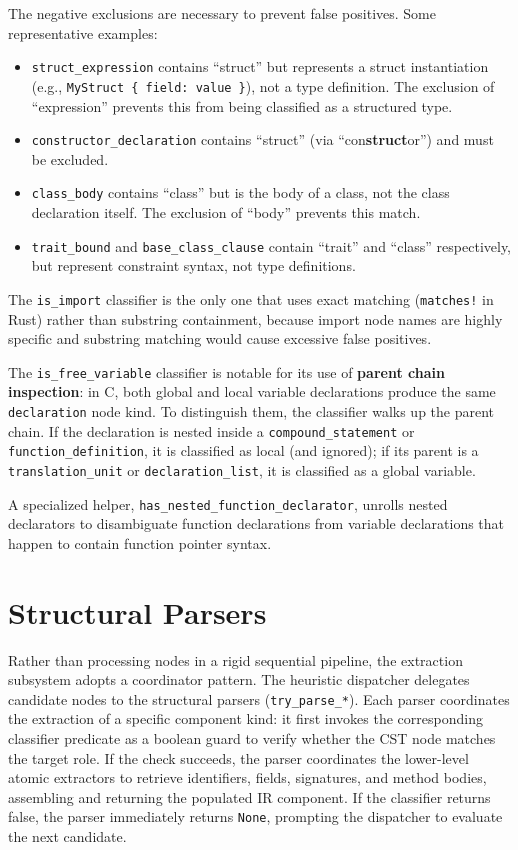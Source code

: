 The negative exclusions are necessary to prevent false positives.
Some representative examples:
\begin{itemize}
  \item \texttt{struct\_expression} contains ``struct'' but
    represents a struct instantiation (e.g., \texttt{MyStruct \{
    field: value \}}), not a type definition. The exclusion of
    ``expression'' prevents this from being classified as a structured type.
  \item \texttt{constructor\_declaration} contains ``struct'' (via
    ``con\textbf{struct}or'') and \linebreak must be excluded.
  \item \texttt{class\_body} contains ``class'' but is the body of a
    class, not the class declaration itself. The exclusion of
    ``body'' prevents this match.
  \item \texttt{trait\_bound} and \texttt{base\_class\_clause}
    contain ``trait'' and ``class'' respectively, but represent
    constraint syntax, not type definitions.
\end{itemize}

The \texttt{is\_import} classifier is the only one that uses exact
matching (\texttt{matches!} in Rust) rather than substring
containment, because import node names are highly specific and
substring matching would cause excessive false positives.

The \texttt{is\_free\_variable} classifier is notable for its use of
\textbf{parent chain inspection}: in C, both global and local
variable declarations produce the same \texttt{declaration} node
kind. To distinguish them, the classifier walks up the parent chain.
If the declaration is nested inside a \texttt{compound\_statement} or
\texttt{function\_definition}, it is classified as local (and
ignored); if its parent is a \texttt{translation\_unit} or
\texttt{declaration\_list}, it is classified as a global variable.

A specialized helper, \texttt{has\_nested\_function\_declarator},
unrolls nested de\-clar\-a\-tors to disambiguate function
declarations from variable declarations that happen to contain
function pointer syntax.

\section{Structural Parsers}
\label{sec:parsers}

Rather than processing nodes in a rigid sequential pipeline, the extraction
subsystem adopts a coordinator pattern. The heuristic dispatcher
delegates candidate nodes to the structural parsers (\texttt{try\_parse\_*}).
Each parser coordinates the extraction of a specific component kind: it first
invokes the corresponding classifier predicate as a boolean guard to verify
whether the CST node matches the target role. If the check succeeds, the parser
coordinates the lower-level atomic extractors to retrieve identifiers, fields,
signatures, and method bodies, assembling and returning the populated IR
component. If the classifier returns false, the parser immediately returns
\texttt{None}, prompting the dispatcher to evaluate the next candidate.

